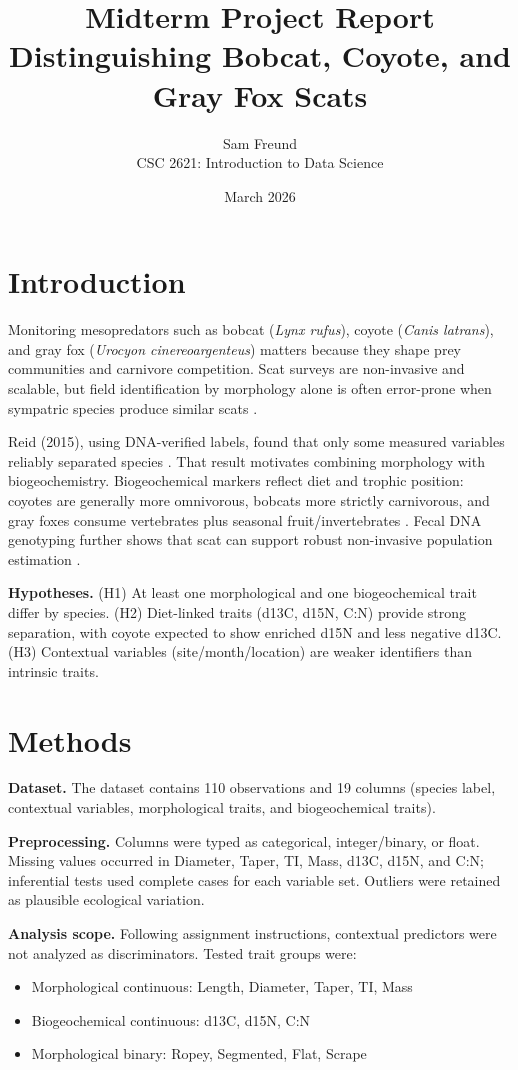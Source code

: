 \documentclass[10pt,a4paper]{article}
\title{Midterm Project Report\\Distinguishing Bobcat, Coyote, and Gray Fox Scats}
\author{Sam Freund\\CSC 2621: Introduction to Data Science}
\date{March 2026}
\begin{document}
\maketitle

\section{Introduction}
Monitoring mesopredators such as bobcat (\textit{Lynx rufus}), coyote (\textit{Canis latrans}), and gray fox (\textit{Urocyon cinereoargenteus}) matters because they shape prey communities and carnivore competition. Scat surveys are non-invasive and scalable, but field identification by morphology alone is often error-prone when sympatric species produce similar scats \cite{reid2015}.

Reid (2015), using DNA-verified labels, found that only some measured variables reliably separated species \cite{reid2015}. That result motivates combining morphology with biogeochemistry. Biogeochemical markers reflect diet and trophic position: coyotes are generally more omnivorous, bobcats more strictly carnivorous, and gray foxes consume vertebrates plus seasonal fruit/invertebrates \cite{adw_bobcat,adw_coyote,adw_grayfox}. Fecal DNA genotyping further shows that scat can support robust non-invasive population estimation \cite{kohn1999}.

\textbf{Hypotheses.} (H1) At least one morphological and one biogeochemical trait differ by species. (H2) Diet-linked traits (d13C, d15N, C:N) provide strong separation, with coyote expected to show enriched d15N and less negative d13C. (H3) Contextual variables (site/month/location) are weaker identifiers than intrinsic traits.

\section{Methods}
\textbf{Dataset.} The dataset contains 110 observations and 19 columns (species label, contextual variables, morphological traits, and biogeochemical traits).

\textbf{Preprocessing.} Columns were typed as categorical, integer/binary, or float. Missing values occurred in Diameter, Taper, TI, Mass, d13C, d15N, and C:N; inferential tests used complete cases for each variable set. Outliers were retained as plausible ecological variation.

\textbf{Analysis scope.} Following assignment instructions, contextual predictors were not analyzed as discriminators. Tested trait groups were:
\begin{itemize}
\item Morphological continuous: Length, Diameter, Taper, TI, Mass
\item Biogeochemical continuous: d13C, d15N, C:N
\item Morphological binary: Ropey, Segmented, Flat, Scrape
\end{itemize}
\end{document}
